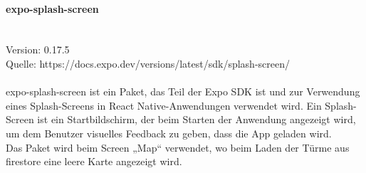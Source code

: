 \paragraph{expo-splash-screen}\mbox{}\\
Version: 0.17.5\\
Quelle: https://docs.expo.dev/versions/latest/sdk/splash-screen/\\ \\
expo-splash-screen ist ein Paket, das Teil der Expo SDK ist und zur Verwendung eines Splash-Screens in React Native-Anwendungen verwendet wird. Ein Splash-Screen ist ein Startbildschirm, der beim Starten der Anwendung angezeigt wird, um dem Benutzer visuelles Feedback zu geben, dass die App geladen wird.\\
Das Paket wird beim Screen „Map“ verwendet, wo beim Laden der Türme aus firestore eine leere Karte angezeigt wird.\\


